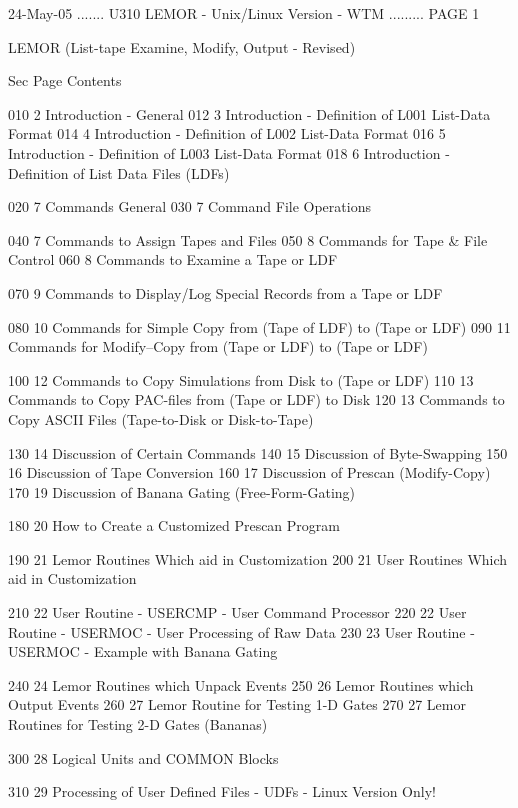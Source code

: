    24-May-05 ....... U310  LEMOR - Unix/Linux Version - WTM ......... PAGE   1
 
 
               LEMOR (List-tape Examine, Modify, Output - Revised)
 
   Sec Page Contents
 
   010   2  Introduction - General
   012   3  Introduction - Definition of L001 List-Data Format
   014   4  Introduction - Definition of L002 List-Data Format
   016   5  Introduction - Definition of L003 List-Data Format
   018   6  Introduction - Definition of List Data Files (LDFs)
 
   020   7  Commands General
   030   7  Command  File Operations
 
   040   7  Commands to  Assign Tapes and Files
   050   8  Commands for Tape & File Control
   060   8  Commands to  Examine a Tape or LDF
 
   070   9  Commands to  Display/Log Special Records from a Tape or LDF
 
   080  10  Commands for Simple  Copy from (Tape of LDF) to (Tape or LDF)
   090  11  Commands for Modify--Copy from (Tape or LDF) to (Tape or LDF)
 
   100  12  Commands to  Copy Simulations from Disk to (Tape or LDF)
   110  13  Commands to  Copy PAC-files from (Tape or LDF) to Disk
   120  13  Commands to  Copy ASCII Files (Tape-to-Disk or Disk-to-Tape)
 
   130  14  Discussion of Certain Commands
   140  15  Discussion of Byte-Swapping
   150  16  Discussion of Tape Conversion
   160  17  Discussion of Prescan (Modify-Copy)
   170  19  Discussion of Banana Gating (Free-Form-Gating)
 
   180  20  How to Create a Customized Prescan Program
 
   190  21  Lemor Routines Which aid in Customization
   200  21  User  Routines Which aid in Customization
 
   210  22  User  Routine -  USERCMP  - User Command Processor
   220  22  User  Routine -  USERMOC  - User Processing of Raw Data
   230  23  User  Routine -  USERMOC  - Example with Banana Gating
 
   240  24  Lemor Routines which Unpack Events
   250  26  Lemor Routines which Output Events
   260  27  Lemor Routine  for Testing  1-D Gates
   270  27  Lemor Routines for Testing  2-D Gates (Bananas)
 
   300  28  Logical Units and COMMON Blocks
 
   310  29  Processing of User Defined Files - UDFs - Linux Version Only!
 
